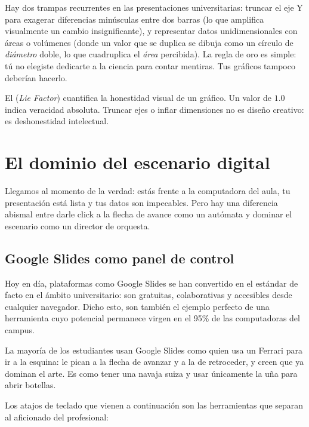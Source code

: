 Hay dos trampas recurrentes en las presentaciones universitarias: truncar el eje Y para exagerar diferencias minúsculas entre dos barras (lo que amplifica visualmente un cambio insignificante), y representar datos unidimensionales con áreas o volúmenes (donde un valor que se duplica se dibuja como un círculo de \emph{diámetro} doble, lo que cuadruplica el \emph{área} percibida).
La regla de oro es simple: tú no elegiste dedicarte a la ciencia para contar mentiras.
Tus gráficos tampoco deberían hacerlo.

\begin{remember}
	\label{rem:integrity}
	El  (\emph{Lie Factor}) cuantifica la honestidad visual de un gráfico.
	Un valor de \(1.0\) indica veracidad absoluta.
	Truncar ejes o inflar dimensiones no es diseño creativo: es deshonestidad intelectual.
\end{remember}

\section{El dominio del escenario digital}
\label{sec:escenariodigital}

Llegamos al momento de la verdad: estás frente a la computadora del aula, tu presentación está lista y tus datos son impecables.
Pero hay una diferencia abismal entre darle click a la flecha de avance como un autómata y dominar el escenario como un director de orquesta.

\subsection*{Google Slides como panel de control}

Hoy en día, plataformas como Google Slides se han convertido en el estándar de facto en el ámbito universitario: son gratuitas, colaborativas y accesibles desde cualquier navegador.
Dicho esto, son también el ejemplo perfecto de una herramienta cuyo potencial permanece virgen en el 95\% de las computadoras del campus.

La mayoría de los estudiantes usan Google Slides como quien usa un Ferrari para ir a la esquina: le pican a la flecha de avanzar y a la de retroceder, y creen que ya dominan el arte.
Es como tener una navaja suiza y usar únicamente la uña para abrir botellas.

Los atajos de teclado que vienen a continuación son las herramientas que separan al aficionado del profesional:

